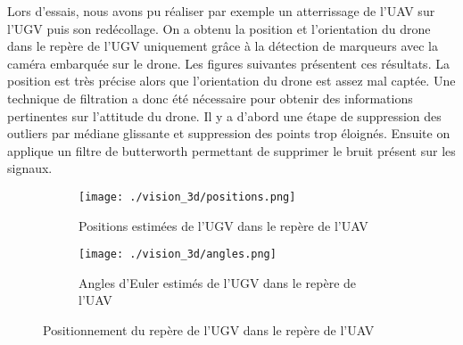     Lors d’essais, nous avons pu réaliser par exemple un atterrissage de l’UAV sur l’UGV puis son redécollage. On a obtenu la position et l’orientation du drone dans le repère de l’UGV uniquement grâce à la détection de marqueurs avec la caméra embarquée sur le drone.  Les figures suivantes présentent ces résultats. La position est très précise alors que l’orientation du drone est assez mal captée. Une technique de filtration a donc été nécessaire pour obtenir des informations pertinentes sur l’attitude du drone. Il y a d’abord une étape de suppression des outliers par médiane glissante et suppression des points trop éloignés. Ensuite on applique un filtre de butterworth permettant de supprimer le bruit présent sur les signaux.

    \begin{figure}[!htb]
        \centering
        \begin{subfigure}[b]{0.45\textwidth}
            \centering
            \texttt{[image: ./vision\_3d/positions.png]}
            \caption{Positions estimées de l'UGV dans le repère de l'UAV}
            \label{fig:plateforme}
        \end{subfigure}
        \hfill
        \begin{subfigure}[b]{0.45\textwidth}
            \centering
            \texttt{[image: ./vision\_3d/angles.png]}
            \caption{Angles d'Euler estimés de l'UGV dans le repère de l'UAV}
            \label{fig:ugv}
        \end{subfigure}
        \caption{Positionnement du repère de l'UGV dans le repère de l'UAV}
        \label{fig:marqueurs_ugv}
    \end{figure}